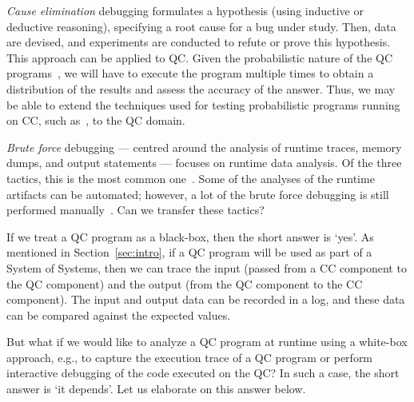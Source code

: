 \documentclass[11pt]{article}
\theoremstyle{plain}
\theoremstyle{definition}
\begin{document}
\textit{Cause elimination} debugging formulates a hypothesis (using inductive or deductive 
reasoning), specifying a root cause for a bug under study. Then, data are devised, and experiments 
are conducted to refute or prove this hypothesis. This approach can be applied to QC. Given the 
probabilistic nature of the QC programs~\cite{nielsen2010quantum, miranskyy2019testing}, we will 
have to execute the program multiple times to obtain a distribution of the results and assess the 
accuracy of the answer. Thus, we may be able to extend the techniques used for testing 
probabilistic programs running on CC, such as~\cite{DuttaLHM18, DuttaZHM19}, to the QC domain.

\textit{Brute force} debugging --- centred around the analysis of runtime traces, memory dumps, and 
output statements ---  focuses on runtime data analysis. Of the three tactics, this is the most 
common one~\cite{pressman2014software}. Some of the analyses of the runtime artifacts can be 
automated; however, a lot of the brute force debugging is still performed 
manually~\cite{pressman2014software}. Can we transfer these tactics? 

If we treat a QC program as a black-box, then the short answer is `yes'.  As mentioned in 
Section~\ref{sec:intro}, if a QC program will be used as part of a System of Systems, then we can 
trace the input (passed from a CC component to the QC component) and the output (from the QC 
component to the CC component). The input and output data can be recorded in a log, and these data 
can be compared against the expected values. 

But what if we would like to analyze a QC program at runtime using a white-box approach, e.g., to 
capture the execution trace of a QC program or perform interactive debugging of the code executed 
on the QC? In such a case, the short answer is `it depends'. Let us elaborate on this answer below.


\end{document}

